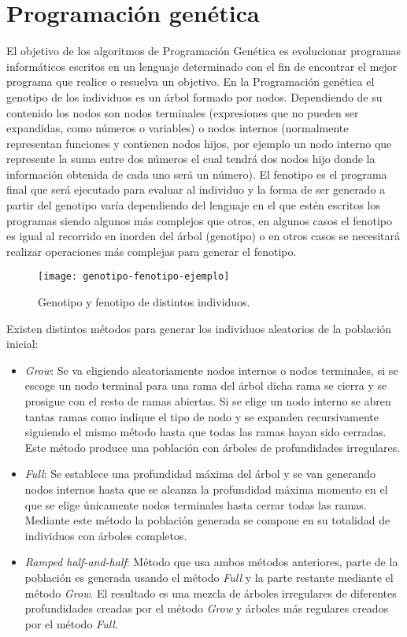 \section{Programación genética}
El objetivo de los algoritmos de Programación Genética es evolucionar programas informáticos escritos en un lenguaje determinado con el fin de encontrar el mejor programa que realice o resuelva un objetivo. En la Programación genética el genotipo de los individuos es un árbol formado por nodos. Dependiendo de su contenido los nodos son nodos terminales (expresiones que no pueden ser expandidas, como números o variables) o nodos internos (normalmente representan funciones y contienen nodos hijos, por ejemplo un nodo interno que represente la suma entre dos números el cual tendrá dos nodos hijo donde la información obtenida de cada uno será un número). El fenotipo es el programa final que será ejecutado para evaluar al individuo y la forma de ser generado a partir del genotipo varía dependiendo del lenguaje en el que estén escritos los programas siendo algunos más complejos que otros, en algunos casos el fenotipo es igual al recorrido en inorden del árbol (genotipo) o en otros casos se necesitará realizar operaciones más complejas para generar el fenotipo\cite{cervigon09}.
\begin{figure}[H]
\centering
\texttt{[image: genotipo-fenotipo-ejemplo]}
\caption{Genotipo y fenotipo de distintos individuos\cite{colmenarApuntes}.}
\end{figure}

Existen distintos métodos para generar los individuos aleatorios de la población inicial:
\begin{itemize}
\item \textit{Grow}: Se va eligiendo aleatoriamente nodos internos o nodos terminales, si se escoge un nodo terminal para una rama del árbol dicha rama se cierra y se prosigue con el resto de ramas abiertas. Si se elige un nodo interno se abren tantas ramas como indique el tipo de nodo y se expanden recursivamente siguiendo el mismo método hasta que todas las ramas hayan sido cerradas. Este método produce una población con árboles de profundidades irregulares.

\item \textit{Full}: Se establece una profundidad máxima del árbol y se van generando nodos internos hasta que se alcanza la profundidad máxima momento en el que se elige únicamente nodos terminales hasta cerrar todas las ramas. Mediante este método la población generada se compone en su totalidad de individuos con árboles completos.

\item \textit{Ramped half-and-half}: Método que usa ambos métodos anteriores, parte de la población es generada usando el método \textit{Full} y la parte restante mediante el método \textit{Grow}. El resultado es una mezcla de árboles irregulares de diferentes profundidades creadas por el método \textit{Grow} y árboles más regulares creados por el método \textit{Full}.
\end{itemize}

